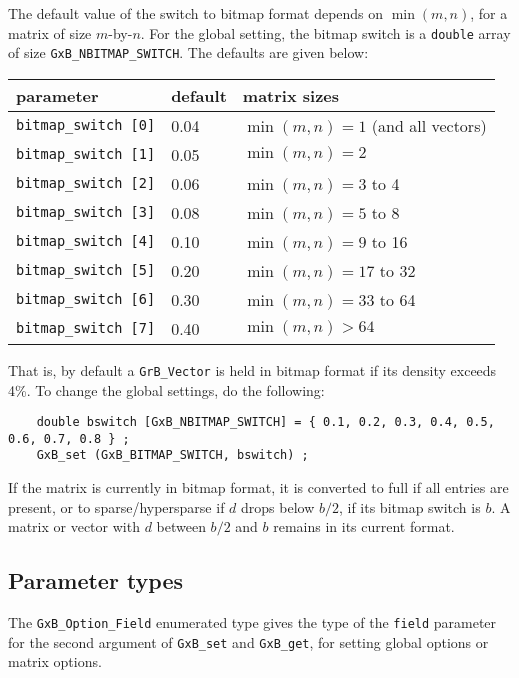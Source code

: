 \documentclass[12pt]{article}
\begin{document}
{The default value of the switch to bitmap format depends on $\min(m,n)$, for a
matrix of size $m$-by-$n$.  For the global setting, the bitmap switch is a
\verb'double' array of size \verb'GxB_NBITMAP_SWITCH'.  The defaults are given
below:

\vspace{0.2in}
{\small
\begin{tabular}{lll}
parameter & default & matrix sizes \\
\hline
\verb'bitmap_switch [0]' & 0.04 & $\min(m,n) = 1$ (and all vectors) \\
\verb'bitmap_switch [1]' & 0.05 & $\min(m,n) = 2$ \\
\verb'bitmap_switch [2]' & 0.06 & $\min(m,n) = 3$ to 4 \\
\verb'bitmap_switch [3]' & 0.08 & $\min(m,n) = 5$ to 8 \\
\verb'bitmap_switch [4]' & 0.10 & $\min(m,n) = 9$ to 16\\
\verb'bitmap_switch [5]' & 0.20 & $\min(m,n) = 17$ to 32\\
\verb'bitmap_switch [6]' & 0.30 & $\min(m,n) = 33$ to 64 \\
\verb'bitmap_switch [7]' & 0.40 & $\min(m,n) > 64$ \\
\end{tabular}
}
\vspace{0.2in}

That is, by default a \verb'GrB_Vector' is held in bitmap format if its density
exceeds 4\%.  To change the global settings, do the following:

{\footnotesize
\begin{verbatim}
    double bswitch [GxB_NBITMAP_SWITCH] = { 0.1, 0.2, 0.3, 0.4, 0.5, 0.6, 0.7, 0.8 } ;
    GxB_set (GxB_BITMAP_SWITCH, bswitch) ;
\end{verbatim}
}

If the matrix is currently in bitmap format, it is converted to full if all
entries are present, or to sparse/hypersparse if $d$ drops below $b/2$, if its
bitmap switch is $b$.  A matrix or vector with $d$ between $b/2$ and $b$
remains in its current format.

\subsection{Parameter types}
The \verb'GxB_Option_Field' enumerated type gives the type of the \verb'field'
parameter for the second argument of \verb'GxB_set' and \verb'GxB_get',
for setting global options or matrix options.

}
\end{document}
